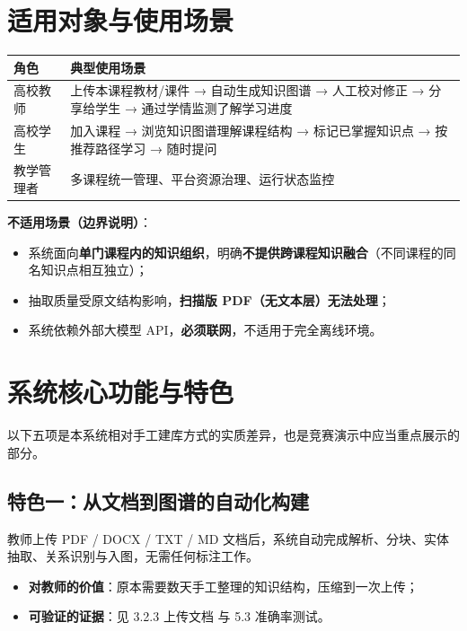 \documentclass[UTF8,a4paper,11pt]{ctexrep}
\begin{document}
\section{适用对象与使用场景}

\begin{center}
\small
\begin{tabularx}{\linewidth}{@{}XX@{}}
\toprule
角色 & 典型使用场景 \\
\midrule
高校教师 & 上传本课程教材/课件 → 自动生成知识图谱 → 人工校对修正 → 分享给学生 → 通过学情监测了解学习进度 \\
高校学生 & 加入课程 → 浏览知识图谱理解课程结构 → 标记已掌握知识点 → 按推荐路径学习 → 随时提问 \\
教学管理者 & 多课程统一管理、平台资源治理、运行状态监控 \\
\bottomrule
\end{tabularx}
\end{center}
\textbf{不适用场景（边界说明）}：

\begin{itemize}
\item 系统面向\textbf{单门课程内的知识组织}，明确\textbf{不提供跨课程知识融合}（不同课程的同名知识点相互独立）；
\item 抽取质量受原文结构影响，\textbf{扫描版 PDF（无文本层）无法处理}；
\item 系统依赖外部大模型 API，\textbf{必须联网}，不适用于完全离线环境。
\end{itemize}

\section{系统核心功能与特色}

以下五项是本系统相对手工建库方式的实质差异，也是竞赛演示中应当重点展示的部分。


\subsection{特色一：从文档到图谱的自动化构建}

教师上传 PDF / DOCX / TXT / MD 文档后，系统自动完成解析、分块、实体抽取、关系识别与入图，无需任何标注工作。

\begin{itemize}
\item \textbf{对教师的价值}：原本需要数天手工整理的知识结构，压缩到一次上传；
\item \textbf{可验证的证据}：见 3.2.3 上传文档 与 5.3 准确率测试。
\end{itemize}
\end{document}
